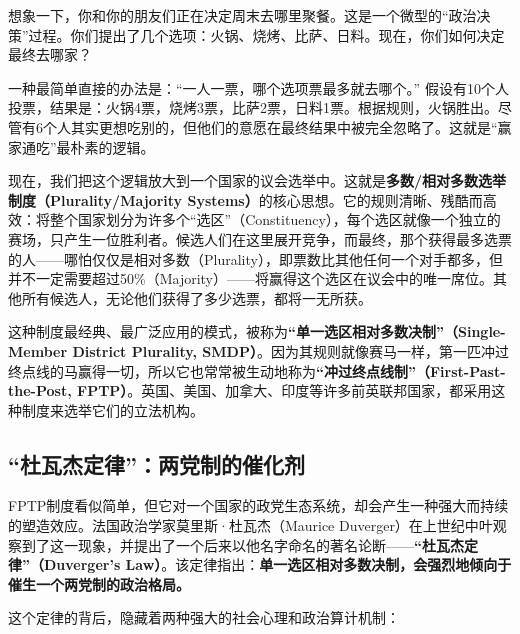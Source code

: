 想象一下，你和你的朋友们正在决定周末去哪里聚餐。这是一个微型的“政治决策”过程。你们提出了几个选项：火锅、烧烤、比萨、日料。现在，你们如何决定最终去哪家？

一种最简单直接的办法是：“一人一票，哪个选项票最多就去哪个。” 假设有10个人投票，结果是：火锅4票，烧烤3票，比萨2票，日料1票。根据规则，火锅胜出。尽管有6个人其实更想吃别的，但他们的意愿在最终结果中被完全忽略了。这就是“赢家通吃”最朴素的逻辑。

现在，我们把这个逻辑放大到一个国家的议会选举中。这就是\textbf{多数/相对多数选举制度（Plurality/Majority Systems）}的核心思想。它的规则清晰、残酷而高效：将整个国家划分为许多个“选区”（Constituency），每个选区就像一个独立的赛场，只产生一位胜利者。候选人们在这里展开竞争，而最终，那个获得最多选票的人——哪怕仅仅是相对多数（Plurality），即票数比其他任何一个对手都多，但并不一定需要超过50\%（Majority）——将赢得这个选区在议会中的唯一席位。其他所有候选人，无论他们获得了多少选票，都将一无所获。

这种制度最经典、最广泛应用的模式，被称为\textbf{“单一选区相对多数决制”（Single-Member District Plurality, SMDP）}。因为其规则就像赛马一样，第一匹冲过终点线的马赢得一切，所以它也常常被生动地称为\textbf{“冲过终点线制”（First-Past-the-Post, FPTP）}。英国、美国、加拿大、印度等许多前英联邦国家，都采用这种制度来选举它们的立法机构。

\subsection{“杜瓦杰定律”：两党制的催化剂}

FPTP制度看似简单，但它对一个国家的政党生态系统，却会产生一种强大而持续的塑造效应。法国政治学家莫里斯·杜瓦杰（Maurice Duverger）在上世纪中叶观察到了这一现象，并提出了一个后来以他名字命名的著名论断——\textbf{“杜瓦杰定律”（Duverger's Law）}。该定律指出：\textbf{单一选区相对多数决制，会强烈地倾向于催生一个两党制的政治格局。}

这个定律的背后，隐藏着两种强大的社会心理和政治算计机制：

